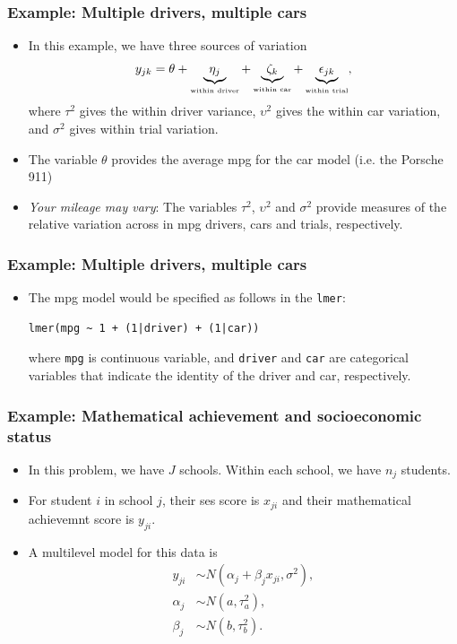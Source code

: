 \documentclass[10pt,xcolor=dvipsnames,serif,professionalfont]{beamer} %
\begin{document}
\begin{frame}
\frametitle{Example: Multiple drivers, multiple cars}
\begin{itemize}
\item In this example, we have three sources of variation 
\[y_{jk} = \theta + \underbrace{\eta_j}_{\text{\tiny within driver}} + \underbrace{\zeta_k}_{\text{\tiny within car}} + \underbrace{\epsilon_{jk}}_{\text{\tiny within trial}},\]
where $\tau^2$ gives the within driver variance, $\upsilon^2$ gives the within car variation, and $\sigma^2$ gives within trial variation.
\item The variable $\theta$ provides the average mpg for the car model (i.e. the Porsche 911)
\item \emph{Your mileage may vary}: The variables $\tau^2$, $\upsilon^2$ and $\sigma^2$ provide measures of the relative variation across in mpg drivers, cars and trials, respectively.
\end{itemize}
\end{frame}


\begin{frame}[fragile]
\frametitle{Example: Multiple drivers, multiple cars}
\begin{itemize}
\item The mpg model would be specified as follows in the \texttt{lmer}:
\begin{center}
\begin{verbatim}
lmer(mpg ~ 1 + (1|driver) + (1|car))
\end{verbatim}
\end{center}
where \texttt{mpg} is continuous variable, and \texttt{driver} and \texttt{car} are categorical variables that indicate the identity of the driver and car, respectively.
\end{itemize}
\end{frame}

\begin{frame}
\frametitle{Example: Mathematical achievement and socioeconomic status}
\begin{itemize}
\item In this problem, we have $J$ schools. Within each school, we have $n_j$ students. 
\item For student $i$ in school $j$, their ses score is $x_{ji}$ and their mathematical achievemnt score is $y_{ji}$.
\item A multilevel model for this data is 
\begin{align*}
y_{ji} &\sim N(\alpha_{j} + \beta_j x_{ji},\sigma^2),\\
\alpha_j &\sim N(a,\tau_a^2),\\
\beta_j &\sim N(b,\tau_b^2).
\end{align*}
\end{itemize}
\end{frame}
\end{document}
